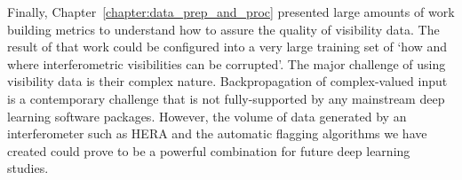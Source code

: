 Finally, Chapter~\ref{chapter:data_prep_and_proc} presented large amounts of work building metrics to understand how to assure the quality of visibility data. The result of that work could be configured into a very large training set of `how and where interferometric visibilities can be corrupted'. The major challenge of using visibility data is their complex nature. Backpropagation of complex-valued input is a contemporary challenge \citep{Guberman.16, Popa.17complex, Zhang.17complex} that is not fully-supported by any mainstream deep learning software packages. However, the volume of data generated by an interferometer such as HERA and the automatic flagging algorithms we have created could prove to be a powerful combination for future deep learning studies.